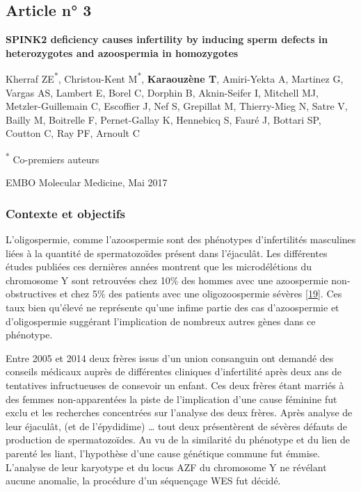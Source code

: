 \documentclass[12pt,twoside]{reedthesis}
\theoremstyle{definition}
\theoremstyle{definition}
\theoremstyle{remark}
\begin{document}
  \newpage
  
  \newpage  
  
  \subsection{Article n° 3}\label{article-n-3}
  
  \textbf{SPINK2 deficiency causes infertility by inducing sperm defects
  in heterozygotes and azoospermia in homozygotes}
  
  Kherraf ZE\textsuperscript{*}, Christou-Kent M\textsuperscript{*},
  \textbf{Karaouzène T}, Amiri-Yekta A, Martinez G, Vargas AS, Lambert E,
  Borel C, Dorphin B, Aknin-Seifer I, Mitchell MJ, Metzler-Guillemain C,
  Escoffier J, Nef S, Grepillat M, Thierry-Mieg N, Satre V, Bailly M,
  Boitrelle F, Pernet-Gallay K, Hennebicq S, Fauré J, Bottari SP, Coutton
  C, Ray PF, Arnoult C
  
  \textsuperscript{*} Co-premiers auteurs
  
  EMBO Molecular Medicine, Mai 2017
  
  \newpage
  
  \subsubsection{Contexte et objectifs}\label{contexte-et-objectifs}
  
  L'oligospermie, comme l'azoospermie sont des phénotypes d'infertilités
  masculines liées à la quantité de spermatozoïdes présent dans
  l'éjaculât. Les différentes études publiées ces dernières années
  montrent que les microdélétions du chromosome Y sont retrouvées chez
  10\% des hommes avec une azoospermie non-obstructives et chez 5\% des
  patients avec une oligozoospermie sévères
  {[}\protect\hyperlink{ref-Hotaling2014}{19}{]}. Ces taux bien qu'élevé
  ne représente qu'une infime partie des cas d'azoospermie et
  d'oligospermie suggérant l'implication de nombreux autres gènes dans ce
  phénotype.
  
  Entre 2005 et 2014 deux frères issus d'un union consanguin ont demandé
  des conseils médicaux auprès de différentes cliniques d'infertilité
  après deux ans de tentatives infructueuses de consevoir un enfant. Ces
  deux frères étant marriés à des femmes non-apparentées la piste de
  l'implication d'une cause féminine fut exclu et les recherches
  concentrées sur l'analyse des deux frères. Après analyse de leur
  éjaculât, (et de l'épydidime) \ldots{} tout deux présentèrent de sévères
  défauts de production de spermatozoïdes. Au vu de la similarité du
  phénotype et du lien de parenté les liant, l'hypothèse d'une cause
  génétique commune fut émmise. L'analyse de leur karyotype et du locus
  AZF du chromosome Y ne révélant aucune anomalie, la procédure d'un
  séquençage WES fut décidé.
  
\end{document}
